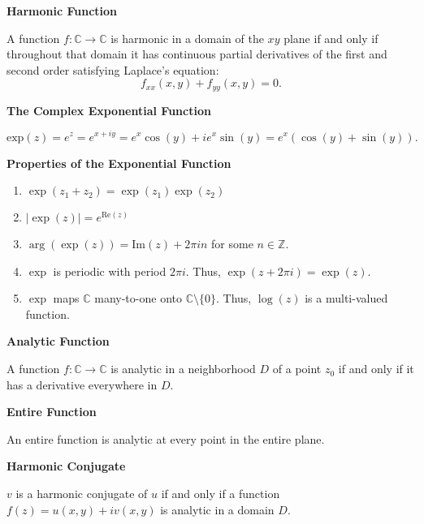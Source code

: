 \documentclass{article}
\newcommand{\C}{\mathbb C}
\begin{document}
\medskip\noindent\textbf{Harmonic Function}

	A function $f: \C \to \C$ is harmonic in a domain of the $xy$ plane if and only if throughout that domain it has continuous partial derivatives of the first and second order satisfying Laplace's equation: $$f_{xx}(x,y) + f_{yy}(x,y)=0.$$

\medskip\noindent\textbf{The Complex Exponential Function}

	$$\text{exp}(z) = e^z = e^{x+iy} = e^x\cos(y) + ie^x\sin(y) = e^x(\cos(y)+\sin(y)).$$

\medskip\noindent\textbf{Properties of the Exponential Function}
\begin{enumerate}
	\item $\exp(z_1 + z_2) = \exp(z_1)\exp(z_2)$
	\item $|\exp(z)| = e^{\text{Re}(z)}$
	\item $\arg(\exp(z)) = \text{Im}(z) + 2\pi in$ for some $n \in \mathbb Z$.
	\item $\exp$ is periodic with period $2\pi i$. Thus, $\exp(z+2\pi i) = \exp(z).$
	\item $\exp$ maps $\C$ many-to-one onto $\C \setminus \{0\}$. Thus, $\log(z)$ is a multi-valued function.
\end{enumerate}

\medskip\noindent\textbf{Analytic Function}

	A function $f: \C \to \C$ is analytic in a neighborhood $D$ of a point $z_0$ if and only if it has a derivative everywhere in $D$.

\medskip\noindent\textbf{Entire Function}

	An entire function is analytic at every point in the entire plane.

\medskip\noindent\textbf{Harmonic Conjugate}

	$v$ is a harmonic conjugate of $u$ if and only if a function $f(z)=u(x,y) + iv(x,y)$ is analytic in a domain $D$.
	
\end{document}
